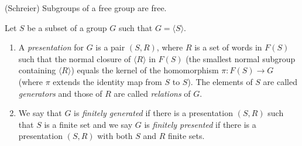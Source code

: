 \documentclass[../main]{subfiles}
\begin{document}
\begin{thm}
 (Schreier) Subgroups of a free group are free.
\end{thm}


\begin{dfn}
 Let $S$ be a subset of a group $G$ such that $G = \langle S \rangle$.
 \begin{enumerate}
  \item A \textit{presentation} for $G$ is a pair $(S, R)$, where $R$ is a set of words in $F(S)$ such that the normal closure of $\langle R \rangle$ in $F(S)$ (the smallest normal subgroup containing $\langle R \rangle$) equals the kernel of the homomorphism $\pi \colon F(S) \to G$ (where $\pi$ extends the identity map from $S$ to $S$). The elements of $S$ are called \textit{generators} and those of $R$ are called \textit{relations} of $G$.
  
  \item We say that $G$ is \textit{finitely generated} if there is a presentation $(S,R)$ such that $S$ is a finite set and we say $G$ is \textit{finitely presented} if there is a presentation $(S,R)$ with both $S$ and $R$ finite sets.
 \end{enumerate}
\end{dfn}
\end{document}
